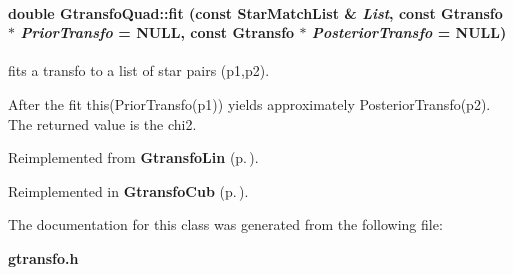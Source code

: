 \paragraph{\setlength{\rightskip}{0pt plus 5cm}double Gtransfo\-Quad::fit (const Star\-Match\-List \& {\em List}, const {\bf Gtransfo} $\ast$ {\em Prior\-Transfo} = NULL, const {\bf Gtransfo} $\ast$ {\em Posterior\-Transfo} = NULL)\hspace{0.3cm}{\tt  [virtual]}}\hfill\label{class_gtransfoquad_a5}


fits a transfo to a list of star pairs (p1,p2).

After the fit this(Prior\-Transfo(p1)) yields approximately Posterior\-Transfo(p2). The returned value is the chi2. 

Reimplemented from {\bf Gtransfo\-Lin} {\rm (p.\,\pageref{class_gtransfolin_a9})}.

Reimplemented in {\bf Gtransfo\-Cub} {\rm (p.\,\pageref{class_gtransfocub_a6})}.

The documentation for this class was generated from the following file:\begin{CompactItemize}
\item 
{\bf gtransfo.h}\end{CompactItemize}

